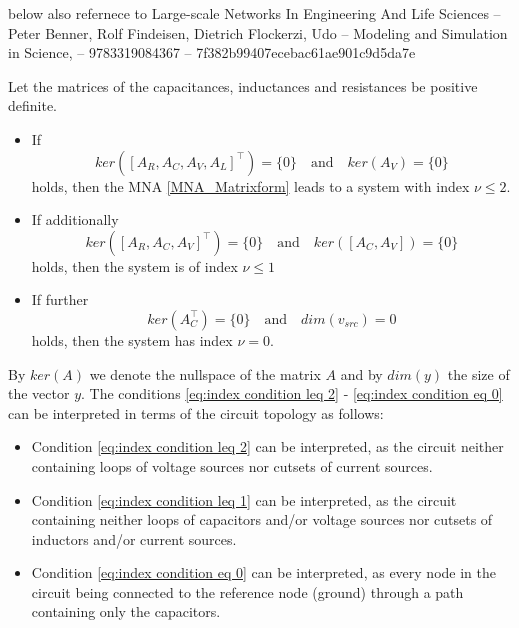 below also refernece to Large-scale Networks In Engineering And Life Sciences -- Peter Benner, Rolf Findeisen, Dietrich Flockerzi, Udo -- Modeling and Simulation in Science, -- 9783319084367 -- 7f382b99407ecebac61ae901c9d5da7e
\begin{theorem}
	Let the matrices of the capacitances, inductances and resistances be positive definite.
	\begin{itemize}
		\item If
		\begin{equation}
			\label{eq:index condition leq 2}
			ker([A_R, A_C, A_V, A_L]^\top) = \{0\} \quad \text{and} \quad ker(A_V) = \{0\}
		\end{equation}
		holds, then the MNA \eqref{MNA_Matrixform} leads to a system with index $\nu \leq 2$.
		
		\item If additionally
		\begin{equation}
			\label{eq:index condition leq 1}
			ker([A_R, A_C, A_V]^\top) = \{0\} \quad \text{and} \quad ker([A_C, A_V]) = \{0\}
		\end{equation}
		holds, then the system is of index $\nu \leq 1$
		
		\item If further
		\begin{equation}
			\label{eq:index condition eq 0}
			ker(A_C^\top) = \{0\} \quad \text{and} \quad dim(v_{src}) = 0
		\end{equation}
		holds, then the system has index $\nu = 0$.
	\end{itemize}
\end{theorem}

By $ker(A)$ we denote the nullspace of the matrix $A$ and by $dim(y)$ the size of the vector $y$. The conditions \eqref{eq:index condition leq 2} - \eqref{eq:index condition eq 0} can be interpreted in terms of the circuit topology as follows:
\begin{itemize}
	\item Condition \eqref{eq:index condition leq 2} can be interpreted, as the circuit neither containing loops of voltage sources nor cutsets of current sources.
	\item Condition \eqref{eq:index condition leq 1} can be interpreted, as the circuit containing neither loops of capacitors and/or voltage sources nor cutsets of inductors and/or current sources.
	\item Condition \eqref{eq:index condition eq 0} can be interpreted, as every node in the circuit being connected to the reference node (ground) through a path containing only the capacitors.
\end{itemize}

